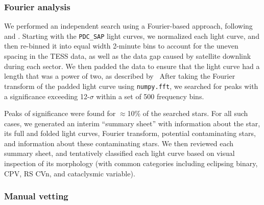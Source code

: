 \documentclass[11pt,twocolumn,tighten]{aastex63}
\begin{document}
\subsubsection{Fourier analysis}
\label{subsec:fourier}

We performed an independent search using a Fourier-based approach,
following \citet{2019ApJ...876..127Z} and \citet[][their
Section~1.3]{2023MNRAS.524.4220P}.  Starting with the {\tt PDC\_SAP}
light curves, we normalized each light curve, and then re-binned it
into equal width 2-minute bins to account for the uneven spacing in
the TESS data, as well as the data gap caused by satellite downlink
during each sector.  We then padded the data to ensure that the light
curve had a length that was a power of two, as described by
\citeauthor{2019ApJ...876..127Z}\ After taking the Fourier transform
of the padded light curve using {\tt numpy.fft}, we searched for peaks
with a significance exceeding 12-$\sigma$ within a set of 500
frequency bins.

Peaks of significance were found for $\approx$10\% of the searched
stars.  For all such cases, we generated an interim ``summary sheet''
with information about the star, its full and folded light curves,
Fourier transform, potential contaminating stars, and information
about these contaminating stars.  We then reviewed each summary sheet,
and tentatively classified each light curve based on visual inspection
of its morphology (with common categories including eclipsing binary,
CPV, RS CVn, and cataclysmic variable).



\subsubsection{Manual vetting}
\label{subsec:visual}
\end{document}
